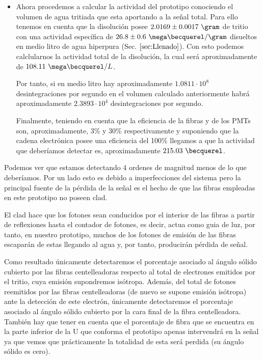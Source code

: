 \begin{itemize}
\item{} Ahora procedemos a calcular la actividad del prototipo conociendo el volumen de agua tritiada que esta aportando a la señal total. Para ello tenemos en cuenta que la disolución posee $2.0169 \pm 0.0017~\gram$ de tritio con una actividad específica de $26.8 \pm 0.6~\mega\becquerel/\gram$ disueltos en medio litro de agua hiperpura (Sec. $\ref{sec:Llenado}$). Con esto podemos calclularnos la actividad total de la disolución, la cual será aproximadamente de $108.11~\mega\becquerel/L$. 

Por tanto, si en medio litro hay aproximadamente $1.0811\cdotp 10^{8}$ desintegraciones por segundo en el volumen calculado anteriormente habrá aproximadamente $2.3893\cdotp 10^{4}$ desintegraciones por segundo.

Finalmente, teniendo en cuenta que la eficiencia de la fibras y de los PMTs son, aproximadamente, 3\% y 30\% respectivamente y suponiendo que la cadena electrónica posee una eficiencia del 100\% llegamos a que la actividad que deberíamos detectar es, aproximadamente $215.03~\becquerel$.

\end{itemize}

Podemos ver que estamos detectando 4 ordenes de magnitud menos de lo que deberíamos. Por un lado esto es debido a imperfecciones del sistema pero la principal fuente de la pérdida de la señal es el hecho de que las fibras empleadas en este prototipo no poseen clad. 

El clad hace que los fotones sean conducidos por el interior de las fibras a partir de reflexiones hasta el contador de fotones, es decir, actua como guia de luz, por tanto, en nuestro prototipo, muchos de los fotones de emisión de las fibras escaparán de estas llegando al agua y, por tanto, producirán pérdida de señal. 

Como resultado únicamente detectaremos el porcentaje asociado al ángulo sólido cubierto por las fibras centelleadoras respecto al total de electrones emitidos por el tritio, cuya emisión supondremos isótropa. Además, del total de fotones reemitidos por las fibras centelleadoras (de nuevo se supone emisión isótropa) ante la detección de este electrón, únicamente detectaremos el porcentaje asociado al ángulo sólido cubierto por la cara final de la fibra centelleadora. También hay que tener en cuenta que el porcentaje de fibra que se encuentra en la parte inferior de la U que conforma el prototipo apenas intervendrá en la señal ya que vemos que prácticamente la totalidad de esta será perdida (su ángulo sólido es cero). 

